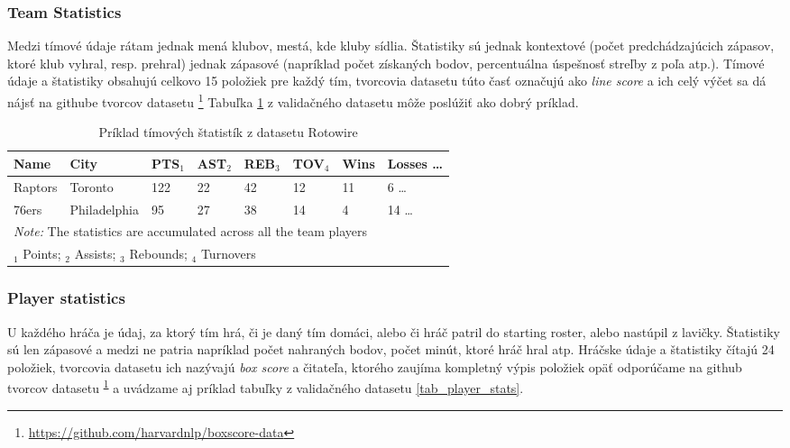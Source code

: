 \subsubsection{Team Statistics}

Medzi tímové údaje rátam jednak mená klubov, mestá, kde kluby sídlia. \linebreak[4] Štatistiky sú jednak kontextové (počet predchádzajúcich zápasov, ktoré klub vyhral, resp. prehral) jednak zápasové (napríklad počet získaných bodov, percentuálna úspešnosť streľby z poľa atp.). Tímové údaje a štatistiky obsahujú celkovo 15 položiek pre každý tím, tvorcovia datasetu túto časť označujú ako \emph{line score} a ich celý výčet sa dá nájsť na githube tvorcov datasetu \footnote{\label{note1}\url{https://github.com/harvardnlp/boxscore-data}} Tabuľka \ref{tab_team_stats} z validačného datasetu môže poslúžiť ako dobrý príklad.

\begin{table}[bh!]
    \begin{tabular}{llllllll}
        \toprule
        Name    & City         & PTS$_1$ & AST$_2$ & REB$_3$ & TOV$_4$ & Wins & Losses  \dots \\
        \midrule
        Raptors & Toronto      & 122 & 22  & 42  & 12  & 11   & 6       \dots \\
        76ers   & Philadelphia & 95  & 27  & 38  & 14  & 4    & 14      \dots \\
        \bottomrule
        \multicolumn{8}{l}{\footnotesize \textit{Note:} The statistics are accumulated across all the team players} \\
        \multicolumn{8}{l}{\footnotesize $_1$ Points; $_2$ Assists; $_3$ Rebounds; $_4$ Turnovers}
    \end{tabular}
    \caption{Príklad tímových štatistík z datasetu Rotowire} \label{tab_team_stats}
\end{table}

\subsubsection{Player statistics}
U každého hráča je údaj, za ktorý tím hrá, či je daný tím domáci, alebo či hráč patril do starting roster, alebo nastúpil z lavičky. Štatistiky sú len zápasové a medzi ne patria napríklad počet nahraných bodov, počet minút, ktoré hráč hral atp. Hráčske údaje a štatistiky čítajú 24 položiek, tvorcovia datasetu ich nazývajú \emph{box score} a čitateľa, ktorého zaujíma kompletný výpis položiek opäť odporúčame na github tvorcov datasetu \textsuperscript{\ref{note1}} a uvádzame aj príklad tabuľky z validačného datasetu \ref{tab_player_stats}.

